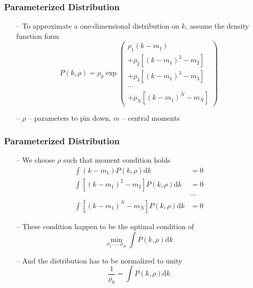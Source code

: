 \documentclass[aspectratio=169, 11pt]{beamer}
\begin{document}
\begin{frame}
\frametitle{Parameterized Distribution}
  \begin{itemize}
    \item[--] To approximate a one-dimensional distribution on $k$, assume the density function form
    \[
      P\left(k,\rho\right)=\rho_{0}\exp\left(\begin{array}{c}
      \rho_{1}\left(k-m_{1}\right)\\
      +\rho_{2}\left[\left(k-m_{1}\right)^{2}-m_{2}\right]\\
      +\rho_{3}\left[\left(k-m_{1}\right)^{3}-m_{3}\right]\\
      \cdots\\
      +\rho_{N}\left[\left(k-m_{1}\right)^{N}-m_{N}\right]
      \end{array}\right)
    \]
    \item[--] $\rho$ -- parameters to pin down, $m$ -- central moments
  \end{itemize}
\end{frame}

\begin{frame}
\frametitle{Parameterized Distribution}
  \begin{itemize}
    \item[--] We choose $\rho$ such that moment condition holds
    \begin{align*}
      \int\left(k-m_{1}\right)P\left(k,\rho\right)\mathrm{d}k & =0\\
      \int\left[\left(k-m_{1}\right)^{2}-m_{2}\right]P\left(k,\rho\right)\mathrm{d}k & =0\\
       & \cdots\\
      \int\left[\left(k-m_{1}\right)^{N}-m_{N}\right]P\left(k,\rho\right)\mathrm{d}k & =0
    \end{align*}
    \item[--] These condition happen to be the optimal condition of
    \[
      \min_{\rho_{1},\ldots,\rho_{N}}\int P\left(k,\rho\right)\mathrm{d}k
    \]
    \item[--] And the distribution has to be normalized to unity
    \[
      \frac{1}{\rho_{0}}=\int P\left(k,\rho\right)\mathrm{d}k
    \]
  \end{itemize}
\end{frame}
\end{document}
